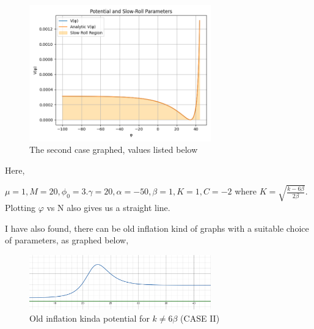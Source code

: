 \documentclass{article}
\begin{document}
\begin{figure}[h!]
    \centering
    \includegraphics[width=0.7\textwidth]{Python/Figures/New Potenial with gravity.png}
    \caption{The second case graphed, values listed below}
    \label{New potential}
\end{figure}

Here,

$\mu = 1    ,M = 20     ,\phi_0 = 3   .\gamma = 20 ,\alpha = -50,\beta = 1 ,K = 1, C = -2  $
where $K = \sqrt{\frac{k-6\beta}{2\beta}}$. Plotting $\varphi$ vs N also gives us a straight line.

I have also found, there can be old inflation kind of graphs with a suitable choice of parameters, as graphed below,

\begin{figure}[h!]
    \centering
    \includegraphics[width=0.7\textwidth]{LaTeX/CASE II Potential.png}
    \caption{Old inflation kinda potential for $k \neq 6\beta$ (CASE II)}
    \label{Old inflation}
\end{figure}

\end{document}
